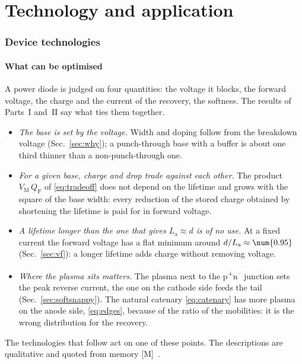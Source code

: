 \documentclass[10pt,a4paper]{scrartcl}
\newcommand{\La}{L_\mathrm{a}}
\newcommand{\VM}{V_\mathrm{M}}
\newcommand{\QF}{Q_\mathrm{F}}
\newcommand{\Pp}{p\textsuperscript{+}}
\newcommand{\Nm}{n\textsuperscript{--}}
\begin{document}
\part{Technology and application}

\section{Device technologies}
\label{sec:technology}
\subsection{What can be optimised}
A power diode is judged on four quantities: the voltage it blocks, the forward voltage, the charge and the current of the recovery, the softness. The results of Parts~I and~II say what ties them together.
\begin{itemize}
\item \emph{The base is set by the voltage.} Width and doping follow from the breakdown voltage (Sec.~\ref{sec:why}); a punch-through base with a buffer is about one third thinner than a non-punch-through one.
\item \emph{For a given base, charge and drop trade against each other.} The product $\VM\,\QF$ of \eqref{eq:tradeoff} does not depend on the lifetime and grows with the square of the base width: every reduction of the stored charge obtained by shortening the lifetime is paid for in forward voltage.
\item \emph{A lifetime longer than the one that gives $\La \approx d$ is of no use.} At a fixed current the forward voltage has a flat minimum around $d/\La \approx \num{\pdVfMinBeta}$ (Sec.~\ref{sec:vf}): a longer lifetime adds charge without removing voltage.
\item \emph{Where the plasma sits matters.} The plasma next to the \Pp\Nm{} junction sets the peak reverse current, the one on the cathode side feeds the tail (Sec.~\ref{sec:softsnappy}). The natural catenary \eqref{eq:catenary} has more plasma on the anode side, \eqref{eq:edges}, because of the ratio of the mobilities: it is the wrong distribution for the recovery.
\end{itemize}
The technologies that follow act on one of these points. The descriptions are qualitative and quoted from memory [M]~\cite{lutz,baliga}.
\end{document}
